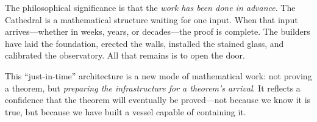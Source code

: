 The philosophical significance is that the \emph{work has been done
in advance}. The Cathedral is a mathematical structure waiting
for one input. When that input arrives---whether in weeks, years,
or decades---the proof is complete. The builders have laid the
foundation, erected the walls, installed the stained glass,
and calibrated the observatory. All that remains is to open the
door.

This ``just-in-time'' architecture is a new mode of mathematical
work: not proving a theorem, but \emph{preparing the infrastructure
for a theorem's arrival}. It reflects a confidence that the
theorem will eventually be proved---not because we know it is true,
but because we have built a vessel capable of containing it.
